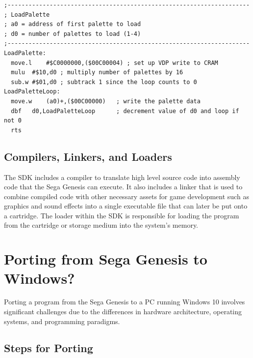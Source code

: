 \documentclass[12pt]{article}
\begin{document}
\begin{lstlisting}
;---------------------------------------------------------------------
; LoadPalette
; a0 = address of first palette to load
; d0 = number of palettes to load (1-4)
;---------------------------------------------------------------------
LoadPalette:
  move.l	#$C0000000,($00C00004) ; set up VDP write to CRAM
  mulu	#$10,d0	; multiply number of palettes by 16
  sub.w	#$01,d0	; subtrack 1 since the loop counts to 0
LoadPaletteLoop:
  move.w	(a0)+,($00C00000)	; write the palette data
  dbf	d0,LoadPaletteLoop		; decrement value of d0 and loop if not 0
  rts
\end{lstlisting}

\subsection*{Compilers, Linkers, and Loaders} 
The SDK includes a compiler to translate high level source code into assembly code that the Sega Genesis can execute. It also includes a linker that is used to combine compiled code with other necessary assets for game development such as graphics and sound effects into a single executable file that can later be put onto a cartridge. The loader within the SDK is responsible for loading the program from the cartridge or storage medium into the system's memory.


\section{Porting from Sega Genesis to Windows?}
Porting a program from the Sega Genesis to a PC running Windows 10 involves significant challenges due to the differences in hardware architecture, operating systems, and programming paradigms.

\subsection*{Steps for Porting}
\end{document}
